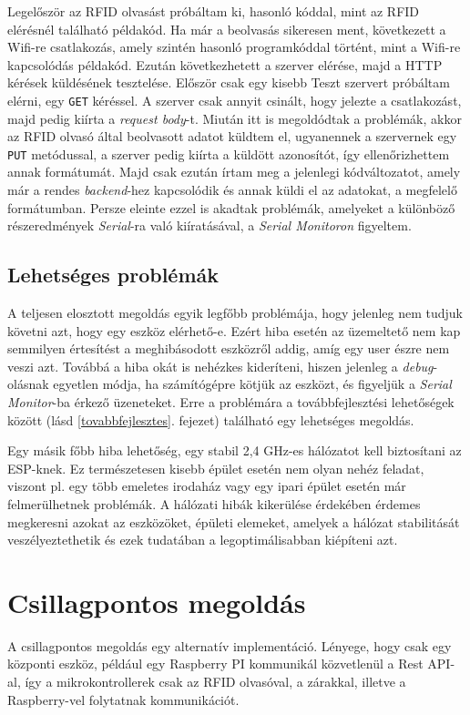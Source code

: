 \documentclass[
]{thesis-ekf}
\theoremstyle{definition}
\theoremstyle{remark}
\begin{document}
Legelőször az RFID olvasást próbáltam ki, hasonló kóddal, mint az RFID elérésnél található példakód. Ha már a beolvasás sikeresen ment, következett a Wifi-re csatlakozás, amely szintén hasonló programkóddal történt, mint a Wifi-re kapcsolódás példakód. Ezután következhetett a szerver elérése, majd a HTTP kérések küldésének tesztelése. Először csak egy kisebb Teszt szervert próbáltam elérni, egy \texttt{GET} kéréssel. A szerver csak annyit csinált, hogy jelezte a csatlakozást, majd pedig kiírta a \emph{request body}-t.
Miután itt is megoldódtak a problémák, akkor az RFID olvasó által beolvasott adatot küldtem el, ugyanennek a szervernek egy \texttt{PUT} metódussal, a szerver pedig kiírta a küldött azonosítót, így ellenőrizhettem annak formátumát.
Majd csak ezután írtam meg a jelenlegi kódváltozatot, amely már a rendes \emph{backend}-hez kapcsolódik és annak küldi el az adatokat, a megfelelő formátumban. Persze eleinte ezzel is akadtak problémák, amelyeket a különböző részeredmények \emph{Serial}-ra való kiíratásával, a \emph{Serial Monitoron} figyeltem.

\section{Lehetséges problémák}
A teljesen elosztott megoldás egyik legfőbb problémája, hogy jelenleg nem tudjuk követni azt, hogy egy eszköz elérhető-e. Ezért hiba esetén az üzemeltető nem kap semmilyen értesítést a meghibásodott eszközről addig, amíg egy user észre nem veszi azt. Továbbá a hiba okát is nehézkes kideríteni, hiszen jelenleg a \emph{debug}-olásnak egyetlen módja, ha számítógépre kötjük az eszközt, és figyeljük a \emph{Serial Monitor}-ba érkező üzeneteket. Erre a problémára a továbbfejlesztési lehetőségek között (lásd \ref{tovabbfejlesztes}. fejezet) található egy lehetséges megoldás.

Egy másik főbb hiba lehetőség, egy stabil 2,4 GHz-es hálózatot kell biztosítani az ESP-knek. Ez természetesen kisebb épület esetén nem olyan nehéz feladat, viszont pl. egy több emeletes irodaház vagy egy ipari épület esetén már felmerülhetnek problémák. A hálózati hibák kikerülése érdekében érdemes megkeresni azokat az eszközöket, épületi elemeket, amelyek a hálózat stabilitását veszélyeztethetik és ezek tudatában a legoptimálisabban kiépíteni azt.

\chapter{Csillagpontos megoldás}
A csillagpontos megoldás egy alternatív implementáció. Lényege, hogy csak egy központi eszköz, például egy Raspberry PI kommunikál közvetlenül a Rest API-al, így a mikrokontrollerek csak az RFID olvasóval, a zárakkal, illetve a Raspberry-vel folytatnak kommunikációt.
\end{document}
